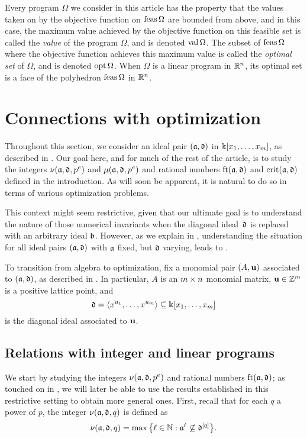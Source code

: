 \documentclass{amsart}
\begin{document}
Every program $\Omega$ we consider in this article has the property that the values taken on by the objective function on $\operatorname{feas} \Omega$ are bounded from above, and in this case, the maximum value achieved by the objective function on this feasible set is called the \emph{value} of the program $\Omega$, and is denoted $\operatorname{val} \Omega$.  The subset of $\operatorname{feas} \Omega$ where the objective function achieves this maximum value is called the \emph{optimal set} of $\Omega$, and is denoted $\operatorname{opt} \Omega$.   When $\Omega$ is a linear program in $\mathbb{R}^n$, its optimal set is a face of the polyhedron $\operatorname{feas} \Omega$ in $\mathbb{R}^n$.

\section{Connections with optimization}
\label{sec: LPs}

Throughout this section, we consider an ideal pair $(\mathfrak{a}, \mathfrak{d})$ in $\Bbbk[x_1, \ldots, x_{m}]$, as described in .
Our goal here, and for much of the rest of the article, is to study the integers $\nu(\mathfrak{a}, \mathfrak{d}, p^e)$ and $\mu(\mathfrak{a}, \mathfrak{d}, p^e)$ and rational numbers $\operatorname{ft}(\mathfrak{a}, \mathfrak{d})$ and $\operatorname{crit}(\mathfrak{a}, \mathfrak{d})$ defined in the introduction.
As will soon be apparent, it is natural to do so in terms of various optimization problems.

\begin{remark} \label{reduction to diagonal :R}
   This context might seem restrictive, given that our ultimate goal is to understand the nature of those numerical invariants when the diagonal ideal~$\mathfrak{d}$ is replaced with an arbitrary ideal $\mathfrak{b}$.
   However, as we explain in , understanding the situation for all ideal pairs $(\mathfrak{a}, \mathfrak{d})$ with $\mathfrak{a}$ fixed, but $\mathfrak{d}$ varying, leads to .
\end{remark}

To transition from algebra to optimization, fix a monomial pair $(A, \mathbf{u})$ associated to $(\mathfrak{a}, \mathfrak{d})$, as described in .  In particular, $A$ is an $m \times n$ monomial matrix, $\mathbf{u} \in \mathbb{Z}^m$ is a positive lattice point, and
\[ \mathfrak{d} = \langle x^{u_1}, \ldots, x^{u_{m}} \rangle \subseteq \Bbbk[x_1, \ldots, x_{m}] \] is the diagonal ideal associated to $\mathbf{u}$.

\subsection{Relations with integer and linear programs}
We start by studying the integers $\nu(\mathfrak{a}, \mathfrak{d}, p^e)$ and rational numbers $\operatorname{ft}(\mathfrak{a}, \mathfrak{d})$; as touched on in , we will later be able to use the results established in this restrictive setting to obtain more general ones.
First, recall that for each $q$ a power of $p$, the integer $\nu(\mathfrak{a}, \mathfrak{d}, q)$ is defined as
\[\nu(\mathfrak{a},\mathfrak{d},q) = \max\big\{\ell \in \mathbb{N} : \mathfrak{a}^{\ell} \not\subseteq \mathfrak{d}^{[q]}\big\}.\]
\end{document}
